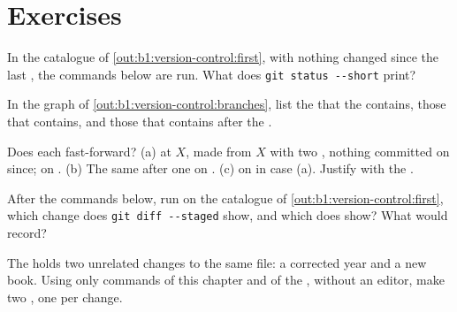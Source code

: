 \section{Exercises}\label{sec:b1:version-control:exercises}

\begin{exercise}[$\star$]\label{exo:b1:version-control:1}
In the catalogue of \cref{out:b1:version-control:first}, with nothing changed since the last , the commands below
are run. What does \texttt{git status -{}-{}short} print?
\end{exercise}

\begin{exercise}[$\star$]\label{exo:b1:version-control:2}
In the graph of \cref{out:b1:version-control:branches}, list the  that the  
contains, those that  contains, and those that  contains after the .
\end{exercise}

\begin{exercise}[$\star$]\label{exo:b1:version-control:3}
Does each  fast-forward? (a)  at  $X$,   made from $X$ with two , nothing
committed on  since;  on . (b) The same after one  on .
(c)  on  in case (a). Justify with the .
\end{exercise}

\begin{exercise}[$\star$]\label{exo:b1:version-control:4}
After the commands below, run on the catalogue of \cref{out:b1:version-control:first}, which change does
\texttt{git diff -{}-{}staged} show, and which does  show? What would  record?
\end{exercise}

\begin{exercise}[$\star\star$]\label{exo:b1:version-control:5}
The  holds two unrelated changes to the same file: a corrected year and a new book. Using only commands of
this chapter and of the , without an editor, make two , one per change.
\end{exercise}

